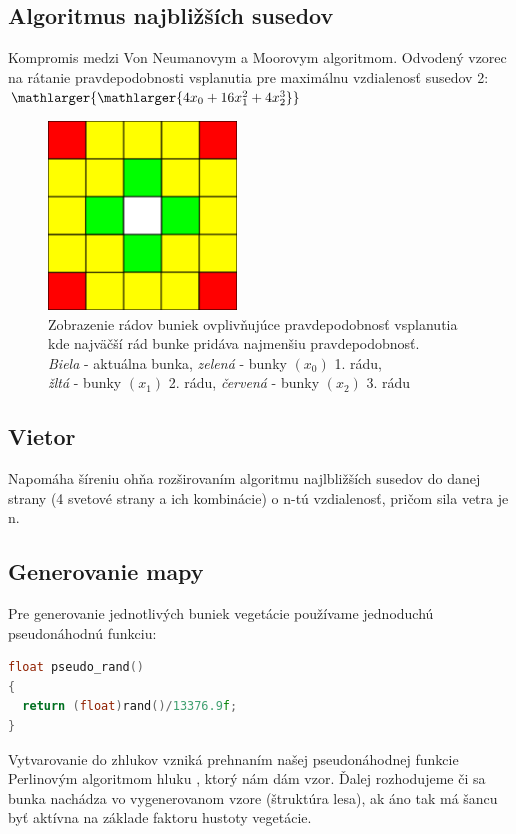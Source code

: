 \documentclass[a4paper,12pt]{article}
\begin{document}
\subsection{Algoritmus najbližších susedov}
Kompromis medzi Von Neumanovym a Moorovym algoritmom. Odvodený vzorec na rátanie pravdepodobnosti vsplanutia pre maximálnu vzdialenosť susedov 2: \quad $\mathlarger{\mathlarger{4x_{0}+16x_{1}^{2}+4x_{2}^{3}}}$
\\
\begin{figure}[htp]
    \centering
    \includegraphics[width=5cm]{neighbor_radius.png}
    \captionsetup{justification=centering,margin=2cm}
    \caption{Zobrazenie rádov buniek ovplivňujúce pravdepodobnosť vsplanutia kde najväčší rád bunke pridáva najmenšiu pravdepodobnosť.\\\textit{Biela} - aktuálna bunka, \textit{zelená} - bunky $(x_{0})$ 1. rádu,\\\textit{žltá} - bunky $(x_{1})$ 2. rádu, \textit{červená} - bunky $(x_{2})$ 3. rádu}
    \label{fig:neighbor_radius}
\end{figure}

\subsection{Vietor}
Napomáha šíreniu ohňa rozširovaním algoritmu najlbližších susedov do danej strany (4 svetové strany a ich kombinácie) o n-tú vzdialenosť, pričom sila vetra je n.

\newpage

\subsection{Generovanie mapy}
Pre generovanie jednotlivých buniek vegetácie používame jednoduchú pseudonáhodnú funkciu: \\
\begin{lstlisting}[language=C++]
float pseudo_rand()
{
  return (float)rand()/13376.9f;  
}
\end{lstlisting}
Vytvarovanie do zhlukov vzniká prehnaním našej pseudonáhodnej funkcie Perlinovým algoritmom hluku \cite{Pnoise}, ktorý nám dám vzor.
Ďalej rozhodujeme či sa bunka nachádza vo vygenerovanom vzore (štruktúra lesa), ak áno tak má šancu byť aktívna na základe faktoru hustoty vegetácie.
\end{document}
